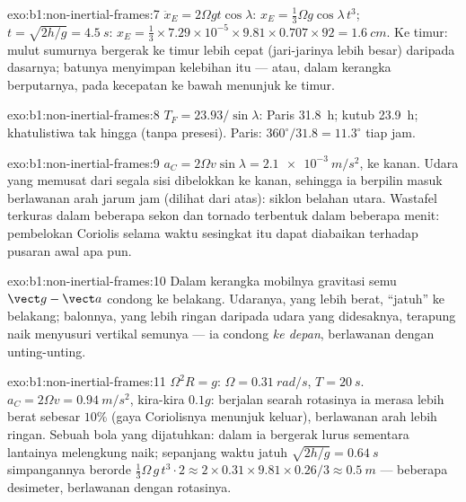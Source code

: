 \begin{solution}{exo:b1:non-inertial-frames:7}
$\ddot x_E = 2\Omega gt\cos\lambda$: $x_E = \tfrac13\Omega g\cos\lambda\,t^3$; $t =
\sqrt{2h/g} = \qty{4.5}{s}$: $x_E = \tfrac13 \times 7.29\times10^{-5} \times 9.81
\times 0.707 \times 92 = \qty{1.6}{cm}$. Ke timur: mulut sumurnya
bergerak ke timur lebih cepat (jari-jarinya lebih besar) daripada dasarnya; batunya
menyimpan kelebihan itu --- atau, dalam kerangka berputarnya,  pada
kecepatan ke bawah menunjuk ke timur.
\end{solution}

\begin{solution}{exo:b1:non-inertial-frames:8}
$T_F = 23.93/\sin\lambda$: Paris \qty{31.8}{h}; kutub \qty{23.9}{h}; khatulistiwa
tak hingga (tanpa presesi). Paris: $360^\circ/31.8 = 11.3^\circ$ tiap jam.
\end{solution}

\begin{solution}{exo:b1:non-inertial-frames:9}
$a_C = 2\Omega v\sin\lambda = \qty{2.1e-3}{m/s^2}$, ke kanan. Udara yang
memusat dari segala sisi dibelokkan ke kanan, sehingga ia berpilin masuk
berlawanan arah jarum jam (dilihat dari atas): siklon belahan utara. Wastafel
terkuras dalam beberapa sekon dan tornado terbentuk dalam beberapa menit: pembelokan
Coriolis selama waktu sesingkat itu dapat diabaikan terhadap pusaran awal apa pun.
\end{solution}

\begin{solution}{exo:b1:non-inertial-frames:10}
Dalam kerangka mobilnya gravitasi semu $\vect g - \vect a$ condong ke belakang.
Udaranya, yang lebih berat, ``jatuh'' ke belakang; balonnya, yang lebih ringan daripada
udara yang didesaknya, terapung naik menyusuri vertikal semunya --- ia condong \emph{ke depan},
berlawanan dengan unting-unting.
\end{solution}

\begin{solution}{exo:b1:non-inertial-frames:11}
$\Omega^2R = g$: $\Omega = \qty{0.31}{rad/s}$, $T = \qty{20}{s}$. $a_C = 2\Omega v
= \qty{0.94}{m/s^2}$, kira-kira $0.1g$: berjalan searah rotasinya ia merasa
lebih berat sebesar $10\%$ (gaya Coriolisnya menunjuk keluar), berlawanan arah
lebih ringan. Sebuah bola yang dijatuhkan: dalam  ia bergerak lurus
sementara lantainya melengkung naik; sepanjang waktu jatuh $\sqrt{2h/g} = \qty{0.64}{s}$
simpangannya berorde $\tfrac13\Omega\,g\,t^3 \cdot 2 \approx 2 \times 0.31 \times
9.81 \times 0.26/3 \approx \qty{0.5}{m}$ --- beberapa desimeter, berlawanan dengan
rotasinya.
\end{solution}

